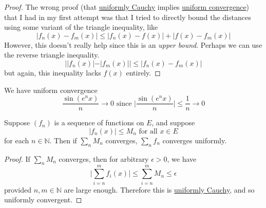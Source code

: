 \begin{proof}
    The wrong proof (that \hyperref[def:uniformly-cauchy]{uniformly Cauchy} implies \hyperref[def:uniform-convergence]{uniform convergence}) that I had in my first attempt was that I tried to directly bound the distances using some variant of the triangle inequality, like 
    \begin{equation}
      |f_n (x) - f_m (x)| \leq |f_n (x) - f(x)| + |f(x) - f_m (x)|
    \end{equation}
    However, this doesn't really help since this is an \textit{upper bound}. Perhaps we can use the reverse triangle inequality. 
    \begin{equation}
      | |f_n (x)| - |f_m (x)| | \leq |f_n (x) - f_m (x)|
    \end{equation}
    but again, this inequality lacks $f(x)$ entirely. 
  \end{proof}

  \begin{example}
    \label{ex:uniform-convergence-since}
    We have uniform convergence
    \begin{equation}
      \frac{\sin(e^n x)}{n} \to 0 \text{ since  } \bigg| \frac{\sin(e^n x)}{n} \bigg| \leq \frac{1}{n} \to 0
    \end{equation}
  \end{example}

  \begin{theorem}
    \label{thm:weierstrass-m-test}
    Suppose $(f_n)$ is a sequence of functions on $E$, and suppose 
    \begin{equation}
      |f_n (x)| \leq M_n \text{ for all } x \in E
    \end{equation}
    for each $n \in \mathbb{N}$. Then if $\sum_n M_n$ converges, $\sum_n f_n$ converges uniformly.  
  \end{theorem}
  \begin{proof}
    If $\sum_n M_n$ converges, then for arbitrary $\epsilon > 0$, we have 
    \begin{equation}
      \bigg| \sum_{i=n}^m f_i (x) \bigg| \leq \sum_{i = n}^m M_n \leq \epsilon
    \end{equation}
    provided $n, m \in \mathbb{N}$ are large enough. Therefore this is \hyperref[def:uniformly-cauchy]{uniformly Cauchy}, and so uniformly convergent. 
  \end{proof} 

